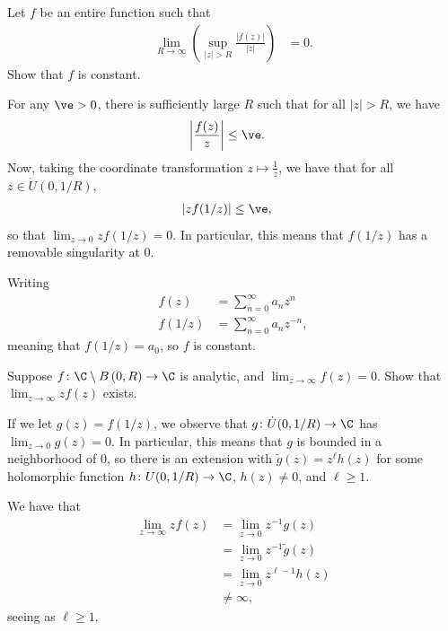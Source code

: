 \documentclass[10pt]{mypackage}
\begin{document}
\begin{problem}[Problem 2]
  Let $f$ be an entire function such that
  \begin{align*}
    \lim_{R\rightarrow\infty}\left( \sup_{|z| > R} \frac{\left\vert f(z) \right\vert}{\left\vert z \right\vert} \right) &= 0.
  \end{align*}
  Show that $f$ is constant.
\end{problem}
\begin{solution}
  For any $\ve > 0$, there is sufficiently large $R$ such that for all $|z| > R$, we have
  \begin{align*}
    \left\vert \frac{f(z)}{z} \right\vert &\leq \ve.
  \end{align*}
  Now, taking the coordinate transformation $z\mapsto \frac{1}{z}$, we have that for all $z\in \dot{U}\left( 0,1/R \right)$,
  \begin{align*}
    \left\vert zf(1/z) \right\vert &\leq \ve,
  \end{align*}
  so that $\lim_{z\rightarrow 0}zf(1/z) = 0$. In particular, this means that $f(1/z)$ has a removable singularity at $0$.

  Writing
  \begin{align*}
    f(z) &= \sum_{n=0}^{\infty}a_nz^{n}\\
    f(1/z) &= \sum_{n=0}^{\infty} a_nz^{-n},
  \end{align*}
  meaning that $f(1/z) = a_0$, so $f$ is constant.
\end{solution}
\begin{problem}[Problem 3]
  Suppose $f\colon \C\setminus B\left( 0,R \right)\rightarrow \C$ is analytic, and $\lim_{z\rightarrow\infty}f(z) = 0$. Show that $\lim_{z\rightarrow\infty}zf(z)$ exists.
\end{problem}
\begin{solution}
  If we let $g(z) = f(1/z)$, we observe that $g\colon \dot{U}(0,1/R)\rightarrow \C$ has $\lim_{z\rightarrow 0} g(z) = 0$. In particular, this means that $g$ is bounded in a neighborhood of $0$, so there is an extension with $ \widetilde{g}(z) = z^{\ell}h(z) $ for some holomorphic function $h\colon U(0,1/R)\rightarrow \C$, $h(z) \neq 0$, and $\ell \geq 1$.

  We have that
  \begin{align*}
    \lim_{z\rightarrow\infty} zf(z) &= \lim_{z\rightarrow 0} z^{-1}g(z)\\
                                    &= \lim_{z\rightarrow 0} z^{- 1} \widetilde{g}(z)\\
                                    &= \lim_{z\rightarrow 0} z^{\ell - 1}h(z)\\
                                    &\neq \infty,
  \end{align*}
  seeing as $\ell \geq 1$.
\end{solution}
\end{document}
